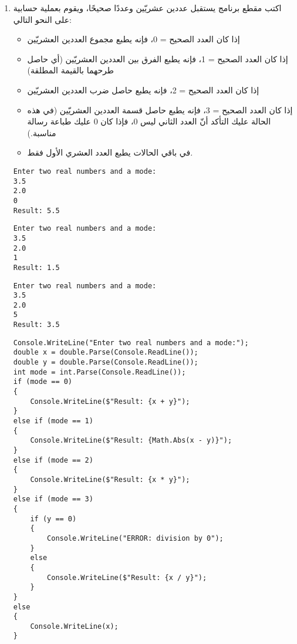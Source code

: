 ﻿\documentclass[12pt]{article}
\begin{document}
\begin{enumerate}[itemsep=3em]
\clearpage
\item
اكتب مقطع برنامج يستقبل عددين عشريّين وعددًا صحيحًا،
ويقوم بعملية حسابية على النحو التالي:
\begin{itemize}
    \item إذا كان العدد الصحيح = 0، فإنه يطبع مجموع العددين العشريّين
    \item إذا كان العدد الصحيح = 1، فإنه يطبع الفرق بين العددين العشريّين (أي حاصل طرحهما بالقيمة المطلقة)
    \item إذا كان العدد الصحيح = 2، فإنه يطبع حاصل ضرب العددين العشريّين
    \item إذا كان العدد الصحيح = 3، فإنه يطبع حاصل قسمة العددين العشريّين (في هذه الحالة عليك التأكد أنّ العدد الثاني ليس 0، فإذا كان 0 عليك طباعة رسالة مناسبة.)
    \item في باقي الحالات يطبع العدد العشري الأول فقط.
\end{itemize}
\ifdetailed
\begin{boxExample}[1]
\begin{english}
\begin{verbatim}
Enter two real numbers and a mode:
3.5
2.0
0
Result: 5.5
\end{verbatim}
\end{english}
\end{boxExample}
\begin{boxExample}[2]
\begin{english}
\begin{verbatim}
Enter two real numbers and a mode:
3.5
2.0
1
Result: 1.5
\end{verbatim}
\end{english}
\end{boxExample}
\begin{boxExample}[2]
\begin{english}
\begin{verbatim}
Enter two real numbers and a mode:
3.5
2.0
5
Result: 3.5
\end{verbatim}
\end{english}
\end{boxExample}
\fi

\ifwithsols
\begin{boxSolution}
\begin{english}
\begin{verbatim}
Console.WriteLine("Enter two real numbers and a mode:");
double x = double.Parse(Console.ReadLine());
double y = double.Parse(Console.ReadLine());
int mode = int.Parse(Console.ReadLine());
if (mode == 0)
{
    Console.WriteLine($"Result: {x + y}");
}
else if (mode == 1)
{
    Console.WriteLine($"Result: {Math.Abs(x - y)}");
}
else if (mode == 2)
{
    Console.WriteLine($"Result: {x * y}");
}
else if (mode == 3)
{
    if (y == 0)
    {
        Console.WriteLine("ERROR: division by 0");
    }
    else
    {
        Console.WriteLine($"Result: {x / y}");
    }
}
else
{
    Console.WriteLine(x);
}
\end{verbatim}
\end{english}
\end{boxSolution}
\clearpage
\fi



\end{enumerate}
\end{document}
